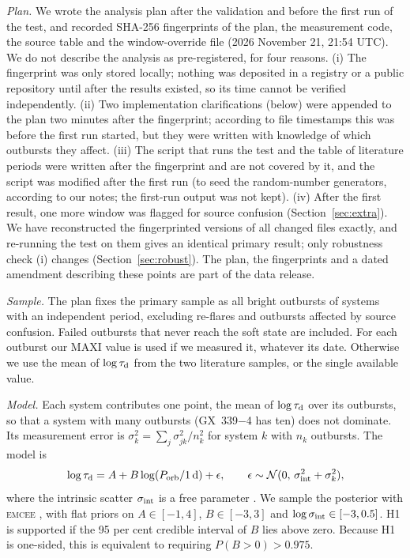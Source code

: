 \documentclass[fleqn,usenatbib]{mnras}
\newcommand{\taud}{\tau_{\rm d}}
\newcommand{\porb}{P_{\rm orb}}
\begin{document}
\textit{Plan.} We wrote the analysis plan after the validation and before the first run of the test, and recorded SHA-256 fingerprints of the plan, the measurement code, the source table and the window-override file (2026 November 21, 21:54 UTC). We do not describe the analysis as pre-registered, for four reasons. (i) The fingerprint was only stored locally; nothing was deposited in a registry or a public repository until after the results existed, so its time cannot be verified independently. (ii) Two implementation clarifications (below) were appended to the plan two minutes after the fingerprint; according to file timestamps this was before the first run started, but they were written with knowledge of which outbursts they affect. (iii) The script that runs the test and the table of literature periods were written after the fingerprint and are not covered by it, and the script was modified after the first run (to seed the random-number generators, according to our notes; the first-run output was not kept). (iv) After the first result, one more window was flagged for source confusion (Section~\ref{sec:extra}). We have reconstructed the fingerprinted versions of all changed files exactly, and re-running the test on them gives an identical primary result; only robustness check (i) changes (Section~\ref{sec:robust}). The plan, the fingerprints and a dated amendment describing these points are part of the data release.

\textit{Sample.} The plan fixes the primary sample as all bright outbursts of systems with an independent period, excluding re-flares and outbursts affected by source confusion. Failed outbursts that never reach the soft state are included. For each outburst our MAXI value is used if we measured it, whatever its date. Otherwise we use the mean of $\log\taud$ from the two literature samples, or the single available value.

\textit{Model.} Each system contributes one point, the mean of $\log\taud$ over its outbursts, so that a system with many outbursts (GX~339$-$4 has ten) does not dominate. Its measurement error is $\sigma_k^2=\sum_j\sigma_{jk}^2/n_k^2$ for system $k$ with $n_k$ outbursts. The model is
\begin{equation}
\log\taud=A+B\log(\porb/1\,{\rm d})+\epsilon,\qquad\epsilon\sim\mathcal{N}(0,\,\sigma_{\rm int}^2+\sigma_k^2),
\label{eq:model}
\end{equation}
where the intrinsic scatter $\sigma_{\rm int}$ is a free parameter \citep{Kelly2007}. We sample the posterior with \textsc{emcee} \citep{ForemanMackey2013}, with flat priors on $A\in[-1,4]$, $B\in[-3,3]$ and $\log\sigma_{\rm int}\in[-3,0.5]$. H1 is supported if the 95 per cent credible interval of $B$ lies above zero. Because H1 is one-sided, this is equivalent to requiring $P(B>0)>0.975$.
\end{document}
